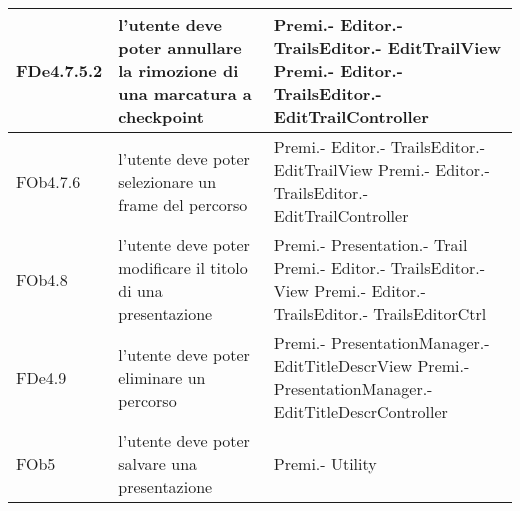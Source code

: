 \begin{longtable}{|l|p{5cm}|p{4cm}|}
\hline
FDe4.7.5.2 & l'utente deve poter annullare la rimozione di una marcatura a checkpoint & Premi.- \linebreak Editor.- \linebreak TrailsEditor.- \linebreak EditTrailView \linebreak Premi.- \linebreak Editor.- \linebreak TrailsEditor.- \linebreak EditTrailController \linebreak \\
\hline
FOb4.7.6 & l'utente deve poter selezionare un frame del percorso & Premi.- \linebreak Editor.- \linebreak TrailsEditor.- \linebreak EditTrailView \linebreak Premi.- \linebreak Editor.- \linebreak TrailsEditor.- \linebreak EditTrailController \linebreak \\
\hline
FOb4.8 & l'utente deve poter modificare il titolo di una presentazione & Premi.- \linebreak Presentation.- \linebreak Trail \linebreak Premi.- \linebreak Editor.- \linebreak TrailsEditor.- \linebreak View \linebreak Premi.- \linebreak Editor.- \linebreak TrailsEditor.- \linebreak TrailsEditorCtrl \linebreak \\
\hline
FDe4.9 & l'utente deve poter eliminare un percorso & Premi.- \linebreak PresentationManager.- \linebreak EditTitleDescrView \linebreak Premi.- \linebreak PresentationManager.- \linebreak EditTitleDescrController \linebreak \\
\hline
FOb5 & l'utente deve poter salvare una presentazione & Premi.- \linebreak Utility \linebreak \\

\end{longtable}

